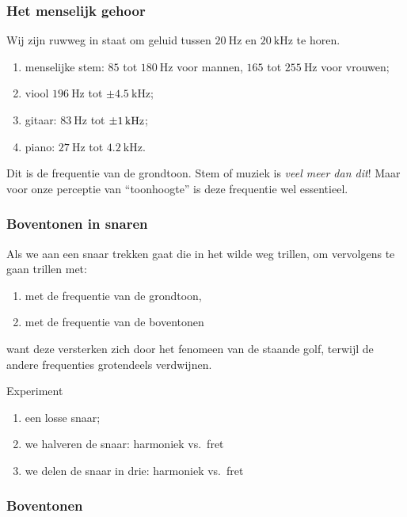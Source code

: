\documentclass[compress, darktitle, framenumber, totalframenumber, handout]{beamer}
\begin{document}
\begin{frame}
  \frametitle{Het menselijk gehoor}

  Wij zijn ruwweg in staat om geluid tussen $\SI{20}{\hertz}$ en $\SI{20}{\kilo\hertz}$ te horen.
  \pause
  \begin{enumerate}
    \item menselijke stem: $85$ tot $\SI{180}{\hertz}$ voor mannen, $165$ tot $\SI{255}{\hertz}$ voor vrouwen;
    \pause\item viool $\SI{196}{\hertz}$ tot $\pm\SI{4.5}{\kilo\hertz}$;
    \pause\item gitaar: $\SI{83}{\hertz}$ tot $\SI{\pm 1}{\kilo\hertz}$;
    \pause\item piano: $\SI{27}{\hertz}$ tot $\SI{4.2}{\kilo\hertz}$.
  \end{enumerate}
  \pause
  Dit is de frequentie van de \alert{grondtoon}. Stem of muziek is \emph{veel meer dan dit}! Maar voor onze perceptie van ``toonhoogte'' is deze frequentie wel essentieel.
\end{frame}

\begin{frame}
  \frametitle{Boventonen in snaren}

  Als we aan een snaar trekken gaat die in het wilde weg trillen, om vervolgens te gaan trillen met:
  \begin{enumerate}
    \item met de frequentie van de grondtoon,
    \item met de frequentie van de boventonen
  \end{enumerate}
  want deze versterken zich door het fenomeen van de staande golf, terwijl de andere frequenties grotendeels verdwijnen.
  \pause
  \begin{block}{Experiment}
    \begin{enumerate}
      \item een losse snaar;
        \pause
      \item we halveren de snaar: harmoniek vs.\ fret
        \pause
      \item we delen de snaar in drie: harmoniek vs.\ fret
    \end{enumerate}
  \end{block}
\end{frame}

\begin{frame}
  \frametitle{Boventonen}

  \centering
\end{frame}
\end{document}
